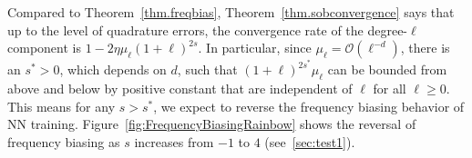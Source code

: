 \documentclass{article} %
\begin{document}
Compared to Theorem~\ref{thm.freqbias}, Theorem~\ref{thm.sobconvergence} says that up to the level of quadrature errors, the convergence rate of the degree-$\ell$ component is $1-2\eta\mu_\ell(1+\ell)^{2s}$. In particular, since $\mu_\ell = \mathcal{O}(\ell^{-d})$, there is an $s^* > 0$, which depends on $d$, such that $(1+\ell)^{2s^*} \mu_\ell$ can be bounded from above and below by positive constant that are independent of $\ell$ for all $\ell\geq 0$. This means for any $s > s^*$, we expect to reverse the frequency biasing behavior of NN training. Figure~\ref{fig:FrequencyBiasingRainbow} shows the reversal of frequency biasing as $s$ increases from $-1$ to $4$ (see~\cref{sec:test1}). 
\end{document}

